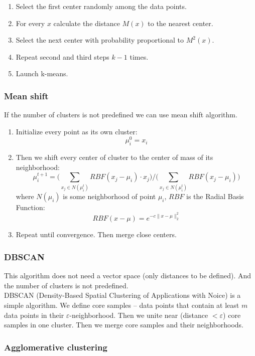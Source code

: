 \begin{enumerate}
	\item Select the first center randomly among the data points.
	\item For every $x$ calculate the distance $M(x)$ to the nearest center.
	\item Select the next center with probability proportional to $M^2(x)$.
	\item Repeat second and third steps $k-1$ times.
	\item Launch k-means.
\end{enumerate}

\subsubsection{Mean shift}

If the number of clusters is not predefined we can use mean shift algorithm.
\begin{enumerate}
	\item Initialize every point as its own cluster: $$\mu_i^0=x_i$$
	\item Then we shift every center of cluster to the center of mass of its neighborhood: $$\mu_i^{t+1}=\Big(\sum\limits_{x_j\in N(\mu_i^t)}RBF(x_j-\mu_i)\cdot x_j\Big)/\Big(\sum\limits_{x_j\in N(\mu_i^t)}RBF(x_j-\mu_i)\Big)$$ where $N(\mu_i)$ is some neighborhood of point $\mu_i$, $RBF$ is the Radial Basis Function: $$RBF(x-\mu)=e^{-c\|x-\mu\|_2^2}$$
	\item Repeat until convergence. Then merge close centers.
\end{enumerate}

\subsubsection*{DBSCAN}

This algorithm does not need a vector space (only distances to be defined). And the number of clusters is not predefined.\\
DBSCAN (Density-Based Spatial Clustering of Applications with Noice) is a simple algorithm. We define core samples -- data points that contain at least $m$ data points in their $\varepsilon$-neighborhood. Then we unite near (distance $<\varepsilon$) core samples in one cluster. Then we merge core samples and their neighborhoods.

\subsubsection*{Agglomerative clustering}

